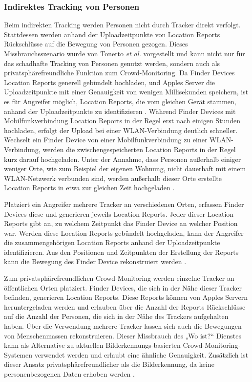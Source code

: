 \subsubsection{Indirektes Tracking von Personen}
Beim indirekten Tracking werden Personen nicht durch Tracker direkt verfolgt.
Stattdessen werden anhand der Uploadzeitpunkte von Location Reports Rückschlüsse auf die Bewegung von Personen gezogen.
Dieses Missbrauchsszenario wurde von Tonetto \textit{et al.} \cite{Tonetto_FindMy} vorgestellt und kann nicht nur für das schadhafte Tracking von Personen genutzt werden, sondern auch als privatsphärefreundliche Funktion zum Crowd-Monitoring.
Da Finder Devices Location Reports generell gebündelt hochladen, und Apples Server die Uploadzeitpunkte mit einer Genauigkeit von wenigen Millisekunden speichern, ist es für Angreifer möglich, Location Reports, die vom gleichen Gerät stammen, anhand der Uploadzeitpunkte zu identifizieren \cite{Tonetto_FindMy}.
Während Finder Devices mit Mobilfunkverbindung Location Reports in der Regel erst nach einigen Stunden hochladen, erfolgt der Upload bei einer WLAN-Verbindung deutlich schneller.
Wechselt ein Finder Device von einer Mobilfunkverbindung zu einer WLAN-Verbindung, werden die zwischengespeicherten Location Reports in der Regel kurz darauf hochgeladen.
Unter der Annahme, dass Personen außerhalb einiger weniger Orte, wie zum Beispiel der eigenen Wohnung, nicht dauerhaft mit einem WLAN-Netzwerk verbunden sind, werden außerhalb dieser Orte erstellte Location Reports in etwa zur gleichen Zeit hochgeladen \cite{Tonetto_FindMy}.

Platziert ein Angreifer mehrere Tracker an verschiedenen Orten, erfassen Finder Devices diese und generieren jeweils Location Reports.
Jeder dieser Location Reports gibt an, zu welchem Zeitpunkt das Finder Device an welcher Position war.
Werden diese Location Reports gebündelt hochgeladen, kann der Angreifer die zusammengehörigen Location Reports anhand der Uploadzeitpunkte identifizieren.
Aus den Positionen und Zeitpunkten der Erstellung der Reports kann die Bewegung des Finder Device rekonstruiert werden \cite{Tonetto_FindMy}.


Zum privatsphärefreundlichen Crowd-Monitoring werden einzelne Tracker an öffentlichen Orten platziert.
Finder Devices, die sich in der Nähe dieser Tracker befinden, generieren Location Reports.
Diese Reports können von Apples Servern heruntergeladen werden und erlauben über die Anzahl der Reports Rückschlüsse auf die Anzahl der Personen, die sich in der Nähe des Trackers aufgehalten haben.
Über die Verwendung mehrere Tracker lassen sich auch die Bewegungen von Menschenmassen rekonstruieren.
Dieser Missbrauch des „Wo ist?“ Dienstes kann als Alternative zu aktuellen Bilderkennungs-basierten Crowd-Monitoring-Systemen verwendet werden und erlaubt eine ähnliche Genauigkeit.
Zusätzlich ist dieser Ansatz privatsphärefreundlicher als die Bilderkennung, da keine personenbezogenen Daten erhoben werden \cite{Tonetto_FindMy}.



